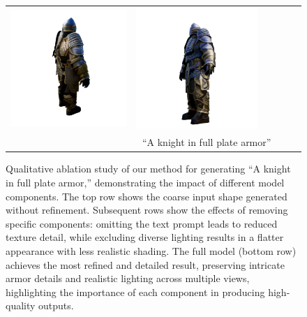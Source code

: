 \begin{figure}
{\begin{tabular}{cccccc}
        \includegraphics[width=0.32\linewidth]{images/ablation_plot/full/full_tile_2.png} &
        \includegraphics[width=0.32\linewidth]{images/ablation_plot/full/full_tile_5.png} \\
        & \multicolumn{3}{c}{``A knight in full plate armor''}
    \end{tabular}
    }
    \caption{Qualitative ablation study of our method for generating “A knight in full plate armor,” demonstrating the impact of different model components. The top row shows the coarse input shape generated without refinement. Subsequent rows show the effects of removing specific components: omitting the text prompt leads to reduced texture detail, while excluding diverse lighting results in a flatter appearance with less realistic shading. The full model (bottom row) achieves the most refined and detailed result, preserving intricate armor details and realistic lighting across multiple views, highlighting the importance of each component in producing high-quality outputs.}
    \label{fig:ablation}
\end{figure}